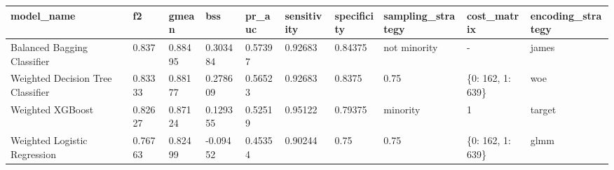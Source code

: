 \begin{tabular}{|l|l|l|l|l|l|l|l|l|l|}
\hline
\textbf{model\_name}              & \textbf{f2} & \textbf{gmean} & \textbf{bss} & \textbf{pr\_auc} & \textbf{sensitivity} & \textbf{specificity} & \textbf{sampling\_strategy} & \textbf{cost\_matrix} & \textbf{encoding\_strategy} \\ \hline
Balanced Bagging Classifier       & 0.837       & 0.88495        & 0.303484     & 0.57397          & 0.92683              & 0.84375              & not minority                & -                     & james                       \\ \hline
Weighted Decision Tree Classifier & 0.83333     & 0.88177        & 0.278609     & 0.56523          & 0.92683              & 0.8375               & 0.75                        & \{0: 162, 1: 639\}    & woe                         \\ \hline
Weighted XGBoost                  & 0.82627     & 0.87124        & 0.129355     & 0.52519          & 0.95122              & 0.79375              & minority                    & 1                     & target                      \\ \hline
Weighted Logistic Regression      & 0.76763     & 0.82499        & -0.09452     & 0.45354          & 0.90244              & 0.75                 & 0.75                        & \{0: 162, 1: 639\}    & glmm                        \\ \hline
\end{tabular}